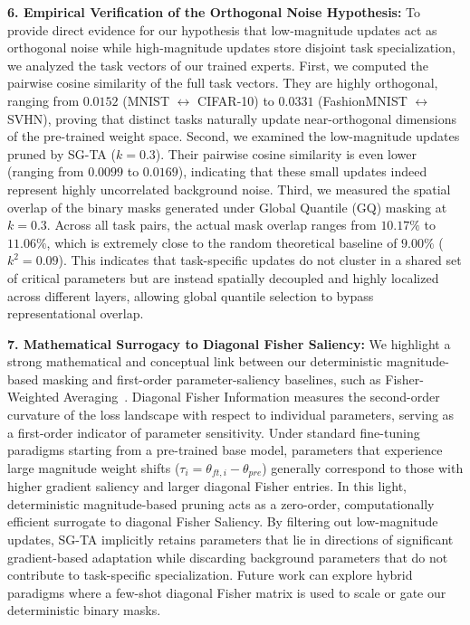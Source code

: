 \textbf{6. Empirical Verification of the Orthogonal Noise Hypothesis:}
To provide direct evidence for our hypothesis that low-magnitude updates act as orthogonal noise while high-magnitude updates store disjoint task specialization, we analyzed the task vectors of our trained experts. First, we computed the pairwise cosine similarity of the full task vectors. They are highly orthogonal, ranging from $0.0152$ (MNIST $\leftrightarrow$ CIFAR-10) to $0.0331$ (FashionMNIST $\leftrightarrow$ SVHN), proving that distinct tasks naturally update near-orthogonal dimensions of the pre-trained weight space. Second, we examined the low-magnitude updates pruned by SG-TA ($k = 0.3$). Their pairwise cosine similarity is even lower (ranging from $0.0099$ to $0.0169$), indicating that these small updates indeed represent highly uncorrelated background noise. Third, we measured the spatial overlap of the binary masks generated under Global Quantile (GQ) masking at $k = 0.3$. Across all task pairs, the actual mask overlap ranges from $10.17\%$ to $11.06\%$, which is extremely close to the random theoretical baseline of $9.00\%$ ($k^2 = 0.09$). This indicates that task-specific updates do not cluster in a shared set of critical parameters but are instead spatially decoupled and highly localized across different layers, allowing global quantile selection to bypass representational overlap.

\textbf{7. Mathematical Surrogacy to Diagonal Fisher Saliency:}
We highlight a strong mathematical and conceptual link between our deterministic magnitude-based masking and first-order parameter-saliency baselines, such as Fisher-Weighted Averaging~\cite{matena2022merging}. Diagonal Fisher Information measures the second-order curvature of the loss landscape with respect to individual parameters, serving as a first-order indicator of parameter sensitivity. Under standard fine-tuning paradigms starting from a pre-trained base model, parameters that experience large magnitude weight shifts ($\tau_i = \theta_{ft,i} - \theta_{pre}$) generally correspond to those with higher gradient saliency and larger diagonal Fisher entries. In this light, deterministic magnitude-based pruning acts as a zero-order, computationally efficient surrogate to diagonal Fisher Saliency. By filtering out low-magnitude updates, SG-TA implicitly retains parameters that lie in directions of significant gradient-based adaptation while discarding background parameters that do not contribute to task-specific specialization. Future work can explore hybrid paradigms where a few-shot diagonal Fisher matrix is used to scale or gate our deterministic binary masks.

